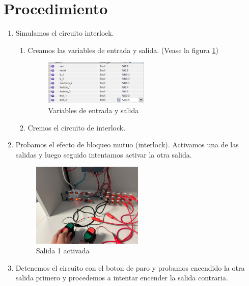 \documentclass[12pt]{report}
\begin{document}
\section{Procedimiento}
\begin{enumerate}
  \item Simulamos el circuito interlock.
  \begin{enumerate}
    \item Creamos las variables de entrada y salida. (Vease la figura \ref{fig:variables})
    \begin{figure}[H]
      \centering
      \includegraphics[width=0.5\textwidth]{screenshots/variables.png}
      \caption{Variables de entrada y salida}
      \label{fig:variables}
    \end{figure}
    \item Cremos el circuito de interlock.
    \begin{center}
      
    \end{center}
  \end{enumerate}
  \item Probamos el efecto de bloqueo mutuo (interlock). Activamos una de las salidas y luego seguido intentamos activar la otra salida.
  \begin{figure}[H]
    \centering
    \includegraphics[width=0.5\textwidth]{screenshots/imagen_1.jpg}
    \caption{Salida 1 activada}
    \label{fig:salidas_1}
  \end{figure}
  \item Detenemos el circuito con el boton de paro y probamos encendido la otra salida primero y procedemos a intentar encender la salida contraria.
  \begin{figure}[H]

\end{figure}
\end{enumerate}
\end{document}
